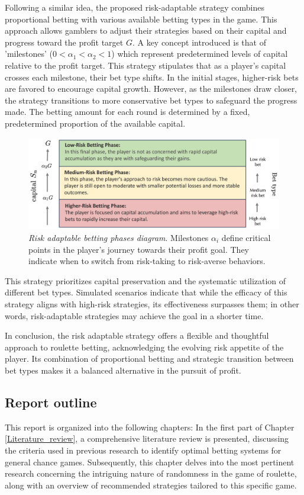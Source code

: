 \documentclass[11pt,twoside]{article}
\numberwithin{Theorem}{section}
\numberwithin{Definition}{section}
\numberwithin{Lemma}{section}
\numberwithin{Algorithm}{section}
\numberwithin{equation}{section}
\begin{document}
Following a similar idea, the proposed risk-adaptable strategy combines proportional betting with various available betting types in the game. This approach allows gamblers to adjust their strategies based on their capital and progress toward the profit target $G$. A key concept introduced is that of 'milestones' ($0 < \alpha_{1} < \alpha_{2} < 1$) which represent predetermined levels of capital relative to the profit target. This strategy stipulates that as a player's capital crosses each milestone, their bet type shifts. In the initial stages, higher-risk bets are favored to encourage capital growth. However, as the milestones draw closer, the strategy transitions to more conservative bet types to safeguard the progress made. The betting amount for each round is determined by a fixed, predetermined proportion of the available capital.

\begin{figure}[H]
        \centering
        \includegraphics[width=13cm]{mixed.png}
        \caption[Risk adaptable betting phases diagram]{\textit{Risk adaptable betting phases diagram}. Milestones $\alpha_{i}$ define critical points in the player's journey towards their profit goal. They indicate when to switch from risk-taking to risk-averse behaviors.}
\end{figure}

This strategy prioritizes capital preservation and the systematic utilization of different bet types. Simulated scenarios indicate that while the efficacy of this strategy aligns with high-risk strategies, its effectiveness surpasses them; in other words, risk-adaptable strategies may achieve the goal in a shorter time.

In conclusion, the risk adaptable strategy offers a flexible and thoughtful approach to roulette betting, acknowledging the evolving risk appetite of the player. Its combination of proportional betting and strategic transition between bet types makes it a balanced alternative in the pursuit of profit.

\subsection{Report outline}
This report is organized into the following chapters:
In the first part of Chapter \ref{Literature_review}, a comprehensive literature review is presented, discussing the criteria used in previous research to identify optimal betting systems for general chance games. Subsequently, this chapter delves into the most pertinent research concerning the intriguing nature of randomness in the game of roulette, along with an overview of recommended strategies tailored to this specific game.
\end{document}
